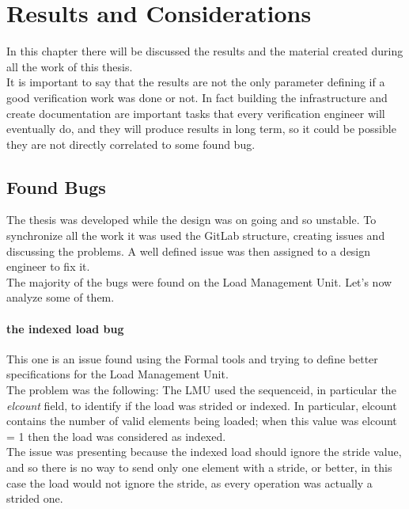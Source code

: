 \chapter{Results and Considerations}
In this chapter there will be discussed the results and the material created during all the work of this thesis.\\

It is important to say that the results are not the only parameter defining if a good verification work was done or not. In fact building the infrastructure and create documentation are important tasks that every verification engineer will eventually do, and they will produce results in long term, so it could be possible they are not directly correlated to some found bug.\\


\section{Found Bugs}
The thesis was developed while the design was on going and so unstable. To synchronize all the work it was used the GitLab structure, creating issues and discussing the problems. A well defined issue was then assigned to a design engineer to fix it.\\

The majority of the bugs were found on the Load Management Unit. Let's now analyze some of them.\\

\subsubsection{the indexed load bug}
This one is an issue found using the Formal tools and trying to define better specifications for the Load Management Unit.\\

The problem was the following:
The LMU used the sequence\+id, in particular the \emph{el\+count} field, to identify if the load was strided or indexed. In particular, el\+count contains the number of valid elements being loaded; when this value was el\+count = 1 then the load was considered as indexed.\\
The issue was presenting because the indexed load should ignore the stride value, and so there is no way to send only one element with a stride, or better, in this case the load would not ignore the stride, as every operation was actually a strided one.\\

